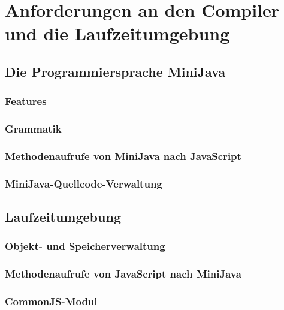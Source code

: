 \chapter{Anforderungen an den Compiler und die Laufzeitumgebung}

\section{Die Programmiersprache MiniJava}
\subsection{Features}
\subsection{Grammatik}
\subsection{Methodenaufrufe von MiniJava nach JavaScript}
\subsection{MiniJava-Quellcode-Verwaltung}

\section{Laufzeitumgebung}
\subsection{Objekt- und Speicherverwaltung}
\subsection{Methodenaufrufe von JavaScript nach MiniJava}
\subsection{CommonJS-Modul}
